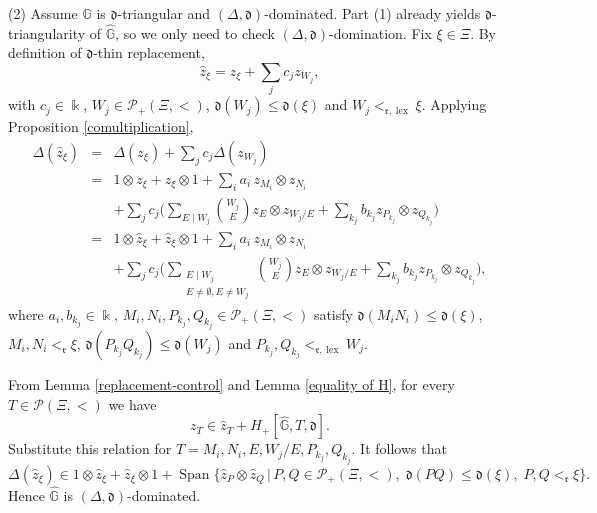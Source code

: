 \documentclass[10pt,a4paper]{amsart}
\makeatletter
\newcommand{\GG}{\mathbb{G}}
\DeclareMathOperator{\Span}{Span}
\newcommand{\dd}{\mathfrak{d}}
\DeclareMathOperator{\lex}{lex}
\renewenvironment{proof}[1][\proofname]{\par
	\pushQED{\qed}%
	\normalfont \topsep6\p@\@plus6\p@\relax
	\trivlist
	\item[\hskip\labelsep
	\bfseries
	#1\@addpunct{.}]\ignorespaces
}{%
	\popQED\endtrivlist\@endpefalse
}
\newcommand{\rr}{\mathfrak{r}}
\makeatother
\begin{document}
\begin{proof}
		(2) Assume $\GG$ is $\dd$-triangular and $(\Delta,\dd)$-dominated. Part (1) already yields $\dd$-triangularity of $\hat{\GG}$, so we only need to check $(\Delta,\dd)$-domination. Fix $\xi\in \Xi$. By definition of $\dd$-thin replacement,
		\[
		\hat{z}_{\xi} =z_{\xi} + \sum_{j}c_{j} z_{W_{j}},
		\]
		with $c_{j}\in \Bbbk$, $W_{j} \in \mathcal{P}_{+}(\Xi, <)$, $\dd(W_{j}) \leq \dd(\xi)$ and $W_{j} <_{\rr,\lex} \xi$. Applying Proposition \ref{comultiplication},
		\begin{eqnarray*}
			\Delta(\hat{z}_{\xi}) & = & \Delta(z_{\xi}) + \sum_{j}c_{j} \Delta(z_{W_{j}}) \\
			& = & 1\otimes z_\xi + z_\xi\otimes 1 + \sum_{i}a_{i}\,z_{M_{i}}\otimes z_{N_{i}} \\
			&& + \sum_{j} c_{j} \Big( \sum_{E\mid W_{j}}  \binom{W_{j}}{E} z_{E} \otimes z_{W_{j}/E} + \sum_{k_{j}} b_{k_{j}} z_{P_{k_{j}}} \otimes z_{Q_{k_{j}}} \Big) \\
			& =& 1\otimes \hat{z}_\xi + \hat{z}_\xi\otimes 1 +  \sum_{i}a_{i}\,z_{M_{i}}\otimes z_{N_{i}} \\
			&& + \sum_{j} c_{j}  \Big(  \sum_{\substack{E\mid W_{j} \\ E\neq \emptyset, E\neq W_{j}}} \binom{W_{j}}{E} z_{E} \otimes z_{W_{j}/E} + \sum_{k_{j}} b_{k_{j}} z_{P_{k_{j}}} \otimes z_{Q_{k_{j}}} \Big),
		\end{eqnarray*}
		where $a_{i}, b_{k_{j}} \in \Bbbk$, $M_{i},N_{i}, P_{k_{j}}, Q_{k_{j}}\in\mathcal{P}_{+}(\Xi,<)$ satisfy
		$\dd(M_{i} N_{i}) \leq \dd(\xi)$, $M_{i}, N_{i}<_{\rr}\xi$,
		$\dd(P_{k_{j}}Q_{k_{j}}) \leq \dd(W_{j})$ and $P_{k_{j}}, Q_{k_{j}} <_{\rr,\lex} W_{j}$.
		
		From Lemma \ref{replacement-control} and Lemma \ref{equality of H}, for every $T\in \mathcal{P}(\Xi, <)$ we have
		\[
		z_{T} \in \hat{z}_{T} + H_{+}[\hat{\GG}, T, \dd].
		\]
		Substitute this relation for $T= M_{i}, N_{i}, E, W_{j}/E, P_{k_{j}}, Q_{k_{j}}$. It follows that
		\[
		\Delta(\hat{z}_{\xi}) \in 1\otimes \hat{z}_\xi + \hat{z}_\xi\otimes 1 + \Span \big \{\hat{z}_{P}\otimes \hat{z}_{Q} \,\big|\, P,Q\in \mathcal{P}_{+}(\Xi, <),\; \dd(PQ) \leq \dd(\xi),\; P, Q <_{\rr} \xi \big\}.
		\]
		Hence $\hat{\GG}$ is $(\Delta,\dd)$-dominated.
	\end{proof}
\end{document}
